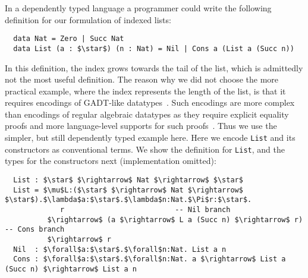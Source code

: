 In a dependently typed language a programmer could write the following definition
for our formulation of indexed lists:
\begin{lstlisting}
  data Nat = Zero | Succ Nat
  data List (a : $\star$) (n : Nat) = Nil | Cons a (List a (Succ n))
\end{lstlisting}
\noindent In this definition, the index grows towards the tail of the list,
which is admittedly not the most useful definition.
The reason why we did not choose the more practical
example, where the index represents the length of the list, is that it requires
encodings of GADT-like datatypes~\citep{gadt1,gadt2}. Such encodings are more
complex than encodings of regular algebraic datatypes as they require explicit
equality proofs and more language-level supports for such proofs~\citep{yang2019pure}. Thus we use the simpler,
but still dependently typed example here.
Here we encode \lstinline{List} and its constructors as conventional terms. We
show the definition for \lstinline{List}, and the types for the constructors next
(implementation omitted):
\begin{lstlisting}
  List : $\star$ $\rightarrow$ Nat $\rightarrow$ $\star$
  List = $\mu$L:($\star$ $\rightarrow$ Nat $\rightarrow$ $\star$).$\lambda$a:$\star$.$\lambda$n:Nat.$\Pi$r:$\star$.
             r                          -- Nil branch
          $\rightarrow$ (a $\rightarrow$ L a (Succ n) $\rightarrow$ r) -- Cons branch
          $\rightarrow$ r
  Nil  : $\forall$a:$\star$.$\forall$n:Nat. List a n
  Cons : $\forall$a:$\star$.$\forall$n:Nat. a $\rightarrow$ List a (Succ n) $\rightarrow$ List a n
\end{lstlisting}
